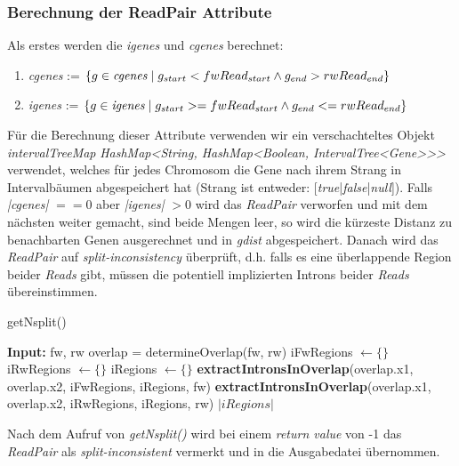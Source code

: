 \documentclass[12pt]{article}
\begin{document}
\subsubsection{Berechnung der ReadPair Attribute}
Als erstes werden die \textit{igenes} und \textit{cgenes} berechnet:
\begin{enumerate}
    \item \textit{cgenes} := $\left\{g \in \textit{cgenes} \hspace{1mm}|\hspace{1mm} g_{start } < fwRead_{start} \land g_{end} > rwRead_{end}\right\}$
    \item \textit{igenes} := $\left\{g \in \textit{igenes} \hspace{1mm}|\hspace{1mm} g_{start} >= fwRead_{start} \land g_{end} <= rwRead_{end}\right\}$
\end{enumerate}
Für die Berechnung dieser Attribute verwenden wir ein verschachteltes Objekt \textit{intervalTreeMap} \textit{HashMap<String, HashMap<Boolean, IntervalTree<Gene>\hspace{0.1mm}>\hspace{0.1mm}>}
verwendet, welches für jedes Chromosom die Gene nach ihrem Strang in Intervalbäumen abgespeichert hat (Strang ist entweder: [\textit{true}|\textit{false}|\textit{null}]).
Falls \textit{|cgenes|} $== 0$ aber \textit{|igenes|} $> 0$  wird das \textit{ReadPair} verworfen und 
mit dem nächsten weiter gemacht, sind beide Mengen leer, so wird die kürzeste Distanz zu benachbarten Genen ausgerechnet und in
\textit{gdist} abgespeichert.
Danach wird das \textit{ReadPair} auf \textit{split-inconsistency} überprüft, d.h. falls es eine überlappende 
Region beider \textit{Reads} gibt, müssen die potentiell implizierten Introns beider \textit{Reads} übereinstimmen.
\begin{algorithm}[!htbp]
\caption{getNsplit()}
\begin{algorithmic}[1]
\State \textbf{Input:} fw, rw 
    \State {} 
\EndIf
\State overlap = determineOverlap(fw, rw) 
\State iFwRegions $\gets \{\}$ 
\State iRwRegions $\gets \{\}$ 
\State iRegions $\gets \{\}$ 
\State \textbf{extractIntronsInOverlap}(overlap.x1, overlap.x2, iFwRegions, iRegions, fw) 
\State \textbf{extractIntronsInOverlap}(overlap.x1, overlap.x2, iRwRegions, iRegions, rw)
\State {} 
\EndIf
{}
\State \Return $|iRegions|$
\EndIf
\State {}
\end{algorithmic}
\end{algorithm}
Nach dem Aufruf von \textit{getNsplit()} wird bei einem \textit{return value} von -1 das \textit{ReadPair} als 
\textit{split-inconsistent} vermerkt und in die Ausgabedatei übernommen.
\end{document}
